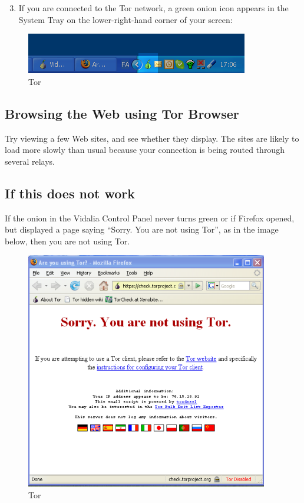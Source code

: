 \begin{enumerate}[1.]
\setcounter{enumi}{2}
\item
  If you are connected to the Tor network, a green onion icon appears in
  the System Tray on the lower-right-hand corner of your screen:
\end{enumerate}
\begin{figure}[htbp]
\centering
\includegraphics{tor_9.png}
\caption{Tor}
\end{figure}

\subsection{Browsing the Web using Tor Browser}

Try viewing a few Web sites, and see whether they display. The sites are
likely to load more slowly than usual because your connection is being
routed through several relays.

\subsection{If this does not work}

If the onion in the Vidalia Control Panel never turns green or if
Firefox opened, but displayed a page saying ``Sorry. You are not using
Tor'', as in the image below, then you are not using Tor.

\begin{figure}[htbp]
\centering
\includegraphics{tor_10.png}
\caption{Tor}
\end{figure}

